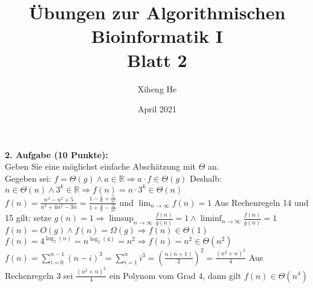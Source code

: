 \documentclass{article}
\title{Übungen zur Algorithmischen Bioinformatik I\\
Blatt 2}
\author{Xiheng He }
\date{April 2021}
\begin{document}
\maketitle
\begin{flushleft}
    \textbf{2. Aufgabe (10 Punkte):}\\
    Geben Sie eine möglichst einfache Abschätzung mit $\Theta$ an.
    \newline\\
    \newline
    Gegeben sei: $f = \Theta(g) \land a \in \mathbb{R} \Longrightarrow a \cdot f \in \Theta(g)$ \qquad
    Deshalb: $n \in \Theta(n) \land 3^k \in \mathbb{R} \Longrightarrow f(n) = n \cdot 3^k \in \Theta(n)$
    \newline\\
    \newline
    $f(n) = \displaystyle\frac{n^3 - n^2 +5}{n^3 + 4n^2 - 3n} = \displaystyle\frac{1 - \frac{1}{n} + \frac{5}{n^3}}{1 + \frac{4}{n} - \frac{3}{n^2}}$ 
    und $\displaystyle\lim_{n\to\infty} f(n) = 1$
    \newline
    Aus Rechenregeln 14 und 15 gilt:
    \newline 
    setze $g(n) = 1 \Longrightarrow \limsup_{n\to\infty}\frac{f(n)}{g(n)} = 1 \land \liminf_{n\to\infty}\frac{f(n)}{g(n)} = 1$
    \newline
    $f(n) = O(g) \land f(n) = \Omega(g) \Longrightarrow f(n) \in \Theta(1)$
    \newline\\
    \newline
    $f(n) = 4^{\log_2 (n)} = n^{\log_2 (4)} = n^2 \Longrightarrow f(n) = n^2 \in \Theta(n^2)$
    \newline\\
    \newline
    $f(n) = \displaystyle\sum_{i=0}^{n - 1}(n - i)^3 = \displaystyle\sum_{i=1}^{n}i^3 = \left(\frac{n(n + 1)}{2}\right)^2 = \frac{(n^2 + n)^2}{4}$
    \newline
    Aus Rechenregeln 3 sei $\frac{(n^2 + n)^2}{4}$ ein Polynom vom Grad 4, dann gilt $f(n) \in \Theta(n^4)$
\end{flushleft}
\end{document}

